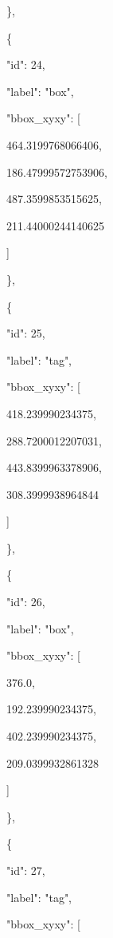 \documentclass[10pt,a4paper]{article}
\begin{document}
    \},\allowbreak{}\par
    \{\par
      "id":\allowbreak{} 24,\allowbreak{}\par
      "label":\allowbreak{} "box",\allowbreak{}\par
      "bbox\_xyxy":\allowbreak{} [\par
        464.3199768066406,\allowbreak{}\par
        186.47999572753906,\allowbreak{}\par
        487.3599853515625,\allowbreak{}\par
        211.44000244140625\par
      ]\par
    \},\allowbreak{}\par
    \{\par
      "id":\allowbreak{} 25,\allowbreak{}\par
      "label":\allowbreak{} "tag",\allowbreak{}\par
      "bbox\_xyxy":\allowbreak{} [\par
        418.239990234375,\allowbreak{}\par
        288.7200012207031,\allowbreak{}\par
        443.8399963378906,\allowbreak{}\par
        308.3999938964844\par
      ]\par
    \},\allowbreak{}\par
    \{\par
      "id":\allowbreak{} 26,\allowbreak{}\par
      "label":\allowbreak{} "box",\allowbreak{}\par
      "bbox\_xyxy":\allowbreak{} [\par
        376.0,\allowbreak{}\par
        192.239990234375,\allowbreak{}\par
        402.239990234375,\allowbreak{}\par
        209.0399932861328\par
      ]\par
    \},\allowbreak{}\par
    \{\par
      "id":\allowbreak{} 27,\allowbreak{}\par
      "label":\allowbreak{} "tag",\allowbreak{}\par
      "bbox\_xyxy":\allowbreak{} [\par
\end{document}
